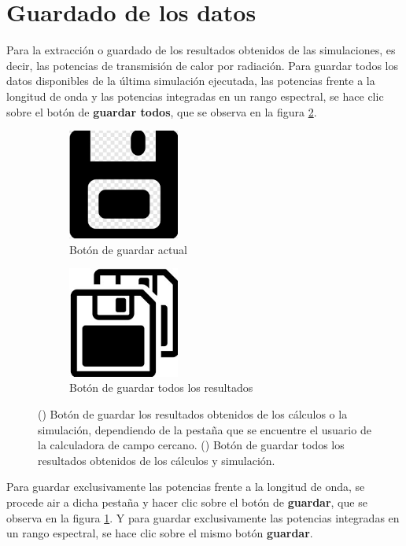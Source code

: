 \section{Guardado de los datos}
Para la extracción o guardado de los resultados obtenidos de las simulaciones, es decir, las potencias de transmisión de calor por radiación. Para guardar todos los datos disponibles de la última simulación ejecutada, las potencias frente a la longitud de onda y las potencias integradas en un rango espectral, se hace clic sobre el botón de \textbf{guardar todos}, que se observa en la figura \ref{fig:SaveAllicon}.
\begin{figure}[H]
	\centering
	\begin{subfigure}[b]{0.48\textwidth}
		\centering
		\includegraphics[width=0.4\textwidth]{figuras/Procedimiento_Simulaciones/Radiacion/SaveButton_Cut.jpg}
		\caption{Botón de guardar actual}
		\label{fig:SaveButton_Cut}
	\end{subfigure}
  \hfill
	\begin{subfigure}[b]{0.48\textwidth}
		\centering
			\includegraphics[width=0.40\textwidth]{figuras/Procedimiento_Simulaciones/Radiacion/SaveAllicon.jpg}
		\caption{Botón de guardar todos los resultados}
		\label{fig:SaveAllicon}
	\end{subfigure}
	\caption{() Botón de guardar los resultados obtenidos de los cálculos o la simulación, dependiendo de la pestaña que se encuentre el usuario de la calculadora de campo cercano. () Botón de guardar todos los resultados obtenidos de los cálculos y simulación.}
	\label{fig:saveButtons}
\end{figure}
Para guardar exclusivamente las potencias frente a la longitud de onda, se procede  air a dicha pestaña y hacer clic sobre el botón de \textbf{guardar}, que se observa en la figura \ref{fig:SaveButton_Cut}. Y para guardar exclusivamente las potencias integradas en un rango espectral, se hace clic sobre el mismo botón \textbf{guardar}.


